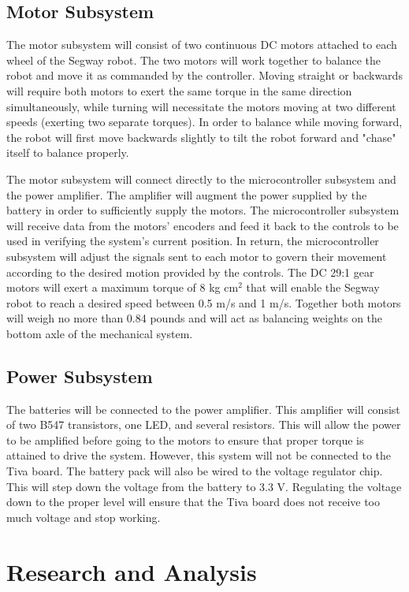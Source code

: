 \documentclass[11pt]{report}
\begin{document}
\begin{spacing}{1.5}
\subsection*{Motor Subsystem}

The motor subsystem will consist of two continuous DC motors attached to each wheel of the Segway robot. The two motors will work together to balance the robot and move it as commanded by the controller. Moving straight or backwards will require both motors to exert the same torque in the same direction simultaneously, while turning will necessitate the motors moving at two different speeds (exerting two separate torques).  In order to balance while moving forward, the robot will first move backwards slightly to tilt the robot forward and "chase" itself to balance properly.

The motor subsystem will connect directly to the microcontroller subsystem and the power amplifier. The amplifier will augment the power supplied by the battery in order to sufficiently supply the motors. The microcontroller subsystem will receive data from the motors’ encoders and feed it back to the controls to be used in verifying the system’s current position. In return, the microcontroller subsystem will adjust the signals sent to each motor to govern their movement according to the desired motion provided by the controls. The DC 29:1 gear motors will exert a maximum torque of 8 kg cm$^2$ that will enable the Segway robot to reach a desired speed between 0.5 m/s and 1 m/s.  Together both motors will weigh no more than 0.84 pounds and will act as balancing weights on the bottom axle of the mechanical system.

\subsection*{Power Subsystem}

The batteries will be connected to the power amplifier. This amplifier will consist of two B547 transistors, one LED, and several resistors. This will allow the power to be amplified before going to the motors to ensure that proper torque is attained to drive the system. However, this system will not be connected to the Tiva board. The battery pack will also be wired to the voltage regulator chip. This will step down the voltage from the battery to 3.3 V. Regulating the voltage down to the proper level will ensure that the Tiva board does not receive too much voltage and stop working.


\section*{Research and Analysis} %


\end{spacing}
\end{document}
